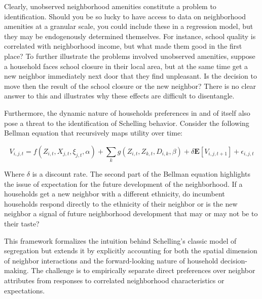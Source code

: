 \documentclass[../main.tex]{subfiles}
\begin{document}
Clearly, unobserved neighborhood amenities constitute a problem to identification. Should you be so lucky to have access to data on neighborhood amenities at a granular scale, you could include these in a regression model, but they may be endogenously determined themselves. For instance, school quality is correlated with neighborhood income, but what made them good in the first place? To further illustrate the problems involved unobserved amenities, suppose a household faces school closure in their local area, but at the same time get a new neighbor immediately next door that they find unpleasant. Is the decision to move then the result of the school closure or the new neighbor? There is no clear answer to this and illustrates why these effects are difficult to disentangle.

Furthermore, the dynamic nature of households preferences in and of itself also pose a threat to the identification of Schelling behavior. Consider the following Bellman equation that recursively maps utility over time:

\begin{equation}
    V_{i, j,t} = f(Z_{i,t}, X_{j,t}, \xi_{j,t}, \alpha) + \sum_k g(Z_{i,t}, Z_{k,t}, D_{i,k}, \beta) + \delta \mathbf{E}[V_{i,j,t+1}]+\epsilon_{i,j,t}
\end{equation}

Where $\delta$ is a discount rate. The second part of the Bellman equation highlights the issue of expectation for the future development of the neighborhood. If a households get a new neighbor with a different ethnicity, do incumbent households respond directly to the ethnicity of their neighbor or is the new neighbor a signal of future neighborhood development that may or may not be to their taste?

This framework formalizes the intuition behind Schelling's classic model of segregation \textcite{schelling1971dynamic} but extends it by explicitly accounting for both the spatial dimension of neighbor interactions and the forward-looking nature of household decision-making. The challenge is to empirically separate direct preferences over neighbor attributes from responses to correlated neighborhood characteristics or expectations.
\end{document}
